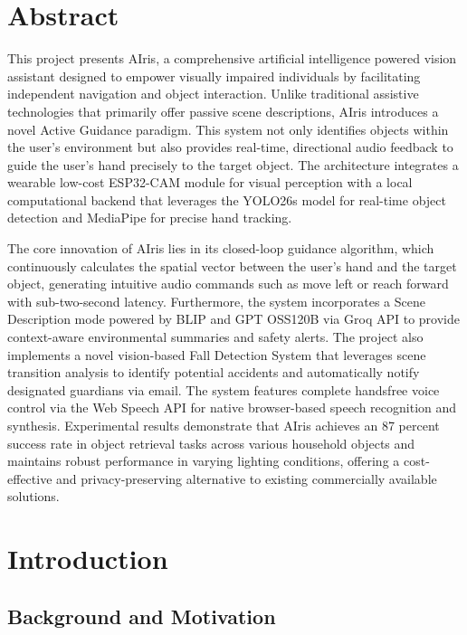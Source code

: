 \documentclass[12pt,a4paper]{report}
\begin{document}
\chapter*{Abstract}

This project presents AIris, a comprehensive artificial intelligence powered vision assistant designed to empower visually impaired individuals by facilitating independent navigation and object interaction. Unlike traditional assistive technologies that primarily offer passive scene descriptions, AIris introduces a novel Active Guidance paradigm. This system not only identifies objects within the user's environment but also provides real-time, directional audio feedback to guide the user's hand precisely to the target object. The architecture integrates a wearable low-cost ESP32-CAM module for visual perception with a local computational backend that leverages the YOLO26s model for real-time object detection and MediaPipe for precise hand tracking.

The core innovation of AIris lies in its closed-loop guidance algorithm, which continuously calculates the spatial vector between the user's hand and the target object, generating intuitive audio commands such as move left or reach forward with sub-two-second latency. Furthermore, the system incorporates a Scene Description mode powered by BLIP and GPT OSS120B via Groq API to provide context-aware environmental summaries and safety alerts. The project also implements a novel vision-based Fall Detection System that leverages scene transition analysis to identify potential accidents and automatically notify designated guardians via email. The system features complete handsfree voice control via the Web Speech API for native browser-based speech recognition and synthesis. Experimental results demonstrate that AIris achieves an 87 percent success rate in object retrieval tasks across various household objects and maintains robust performance in varying lighting conditions, offering a cost-effective and privacy-preserving alternative to existing commercially available solutions.

\tableofcontents
\listoffigures
\listoftables


\chapter{Introduction}

\section{Background and Motivation}
\end{document}
